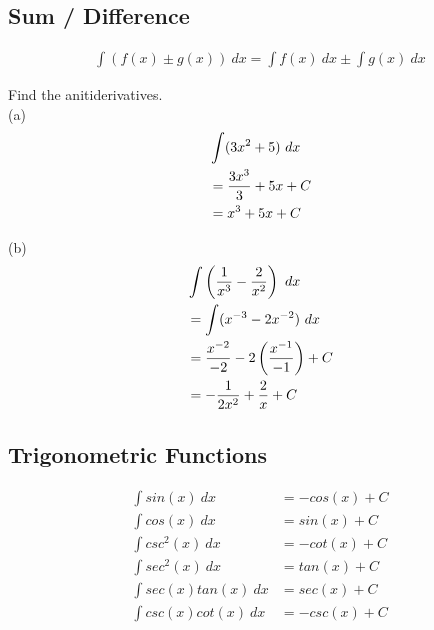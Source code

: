 \subsection{Sum / Difference}

\begin{theorem}
    \begin{align}
        \int (f(x) \pm g(x)) \ dx = \int f(x) \ dx \pm \int g(x) \ dx
    \end{align}
\end{theorem}

\begin{exercise}\nonumber
    Find the anitiderivatives. \\

    (a)
    \begin{align}
         & \int (3x^2 + 5) \ dx      \\
         & = {3x^3 \over 3} + 5x + C \\
         & = x^3 + 5x + C            \\
    \end{align}

    (b)
    \begin{align}
         & \int \left({1 \over x^3} - {2 \over x^2}\right) \ dx      \\
         & = \int (x^{-3} - 2x^{-2}) \ dx                            \\
         & = {x^{-2} \over -2} - 2\left({x^{-1} \over -1}\right) + C \\
         & = -{1 \over 2x^2} + {2 \over x} + C
    \end{align}
\end{exercise}

\subsection{Trigonometric Functions}

\begin{theorem}
    \begin{align}
        \int sin(x) \ dx       & = -cos(x) + C \\
        \int cos(x) \ dx       & = sin(x) + C  \\
        \int csc^2(x) \ dx     & = -cot(x) + C \\
        \int sec^2(x) \ dx     & = tan(x) + C  \\
        \int sec(x)tan(x) \ dx & = sec(x) + C  \\
        \int csc(x)cot(x) \ dx & = -csc(x) + C
    \end{align}
\end{theorem}

